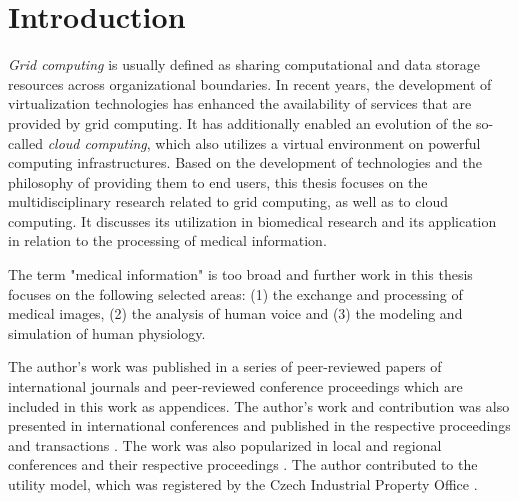\chapter{Introduction}

\emph{Grid computing} is usually defined as sharing computational and data storage resources across organizational boundaries. In recent years, the development of virtualization technologies has enhanced the availability of services that are provided by grid computing. It has additionally enabled an evolution of the so-called \emph{cloud computing}, which also utilizes a virtual environment on powerful computing infrastructures. Based on the development of technologies and the philosophy of providing them to end users, this thesis focuses on the multidisciplinary research related to grid computing, as well as to cloud computing. It discusses its utilization in biomedical research and its application in relation to the processing of medical information.

The term "medical information" is too broad and further work in this thesis focuses on the following selected areas:
(1) the exchange and processing of medical images, (2) the analysis of human voice and (3) the modeling and simulation of human physiology. %

The author's work was published in a series of peer-reviewed papers of international journals and peer-reviewed conference proceedings \cite{kulhanek2009, kulhanek2010b, kulhanek2010c,  
Kulhanek2014Parameters, Kulhanek2014Modeling, Kulhanek2014mefanet, Matejak2014sj} which are included in this work as appendices.
The author's work and contribution was also presented in international conferences and published in the respective proceedings and transactions
\cite{Kulhanek2010, Kulhanek2013c, kofranek2013hummod, Matejak2014}. The work was also popularized in local and regional conferences and their respective proceedings \cite{Kulhanek2008Mefanet, Sarek2009, kulhanek2009dd, Kulhanek2009Mefanet, Kulhanek2010d, Kulhanek2010Mefanet, Kulhanek2011, kulhanek2011dd, Kulhanek2012, Kulhanek2013b, Kulhanek2014, Kulhanek2012a}. The author contributed to the utility model, which was registered by the Czech Industrial Property Office \cite{Kofranek2014a}.

